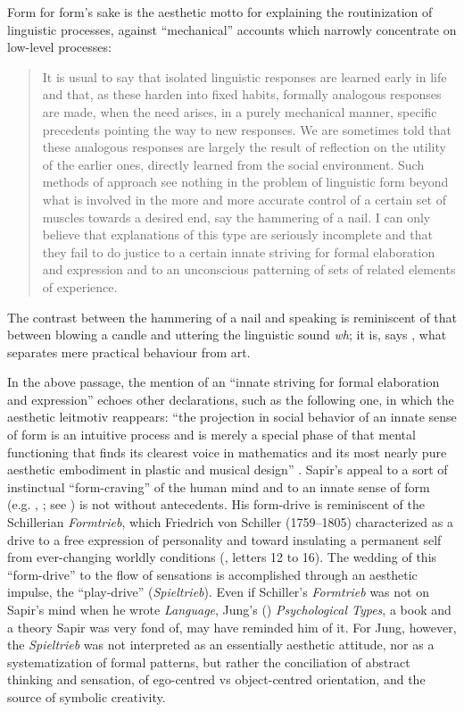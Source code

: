 \documentclass[output=paper]{langscibook}
\begin{document}
Form for form's sake is the aesthetic motto for explaining the routinization of linguistic processes, against ``mechanical'' accounts which narrowly concentrate on low-level processes:

\begin{quotation}
It is usual to say that isolated linguistic responses are learned early in life and that, as these harden into fixed habits, formally analogous responses are made, when the need arises, in a purely mechanical manner, specific precedents pointing the way to new responses. We are sometimes told that these analogous responses are largely the result of reflection on the utility of the earlier ones, directly learned from the social environment. Such methods of approach see nothing in the problem of linguistic form beyond what is involved in the more and more accurate control of a certain set of muscles towards a desired end, say the hammering of a nail. I can only believe that explanations of this type are seriously incomplete and that they fail to do justice to a certain innate striving for formal elaboration and expression and to an unconscious patterning of sets of related elements of experience. \citep[156]{Sapir1924} 
\end{quotation}

The contrast between the hammering of a nail and speaking is reminiscent of that between blowing a candle and uttering the linguistic sound \emph{wh}; it is, says \citet[34]{Sapir1925}, what separates mere practical behaviour from art.

In the above passage, the mention of an ``innate striving for formal elaboration and expression'' echoes other declarations, such as the following one, in which the aesthetic leitmotiv reappears: ``the projection in social behavior of an innate sense of form is an intuitive process and is merely a special phase of that mental functioning that finds its clearest voice in mathematics and its most nearly pure aesthetic embodiment in plastic and musical design'' \citep[344]{Sapir1927a}. Sapir's appeal to a sort of instinctual ``form-craving'' of the human mind and to an innate sense of form (e.g. \citealt{Sapir1924}, \citealt{Sapir1927a}; see \citealt[445]{Handler1986}) is not without antecedents. His form-drive is reminiscent of the Schillerian \emph{Formtrieb}, which Friedrich von Schiller (1759--1805) characterized as a drive to a free expression of personality and toward insulating a permanent self from ever-changing worldly conditions (\citealt{Schiller1795}, letters 12 to 16). The wedding of this ``form-drive'' to the flow of sensations is accomplished through an aesthetic impulse, the ``play-drive'' (\emph{Spieltrieb}). Even if Schiller's \emph{Formtrieb} was not on Sapir's mind when he wrote \emph{Language}, Jung's (\citeyear{Jung1921}) \emph{Psychological Types}, a book and a theory Sapir was very fond of, may have reminded him of it. For Jung, however, the \emph{Spieltrieb} was not interpreted as an essentially aesthetic attitude, nor as a systematization of formal patterns, but rather the conciliation of abstract thinking and sensation, of ego-centred vs object-centred orientation, and the source of symbolic creativity.
\end{document}
